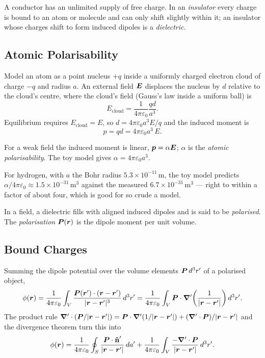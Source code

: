 A conductor has an unlimited supply of free charge. In an \emph{insulator} every charge is bound to an atom or molecule and can only shift slightly within it; an insulator whose charges shift to form induced dipoles is a \emph{dielectric}.

\subsection{Atomic Polarisability}

\begin{example}
Model an atom as a point nucleus $+q$ inside a uniformly charged electron cloud of charge $-q$ and radius $a$. An external field $\vect{E}$ displaces the nucleus by $d$ relative to the cloud's centre, where the cloud's field (Gauss's law inside a uniform ball) is
\[
    E_\text{cloud} = \frac{1}{4\pi\varepsilon_0}\frac{qd}{a^3}.
\]
Equilibrium requires $E_\text{cloud}=E$, so $d = 4\pi\varepsilon_0 a^3E/q$ and the induced moment is
\[
    p = qd = 4\pi\varepsilon_0a^3\,E .
\]
\end{example}

\begin{definition}
For a weak field the induced moment is linear, $\lvect{p}=\alpha\vect{E}$; $\alpha$ is the \emph{atomic polarisability}. The toy model gives $\alpha=4\pi\varepsilon_0a^3$.
\end{definition}

For hydrogen, with $a$ the Bohr radius $5.3\times10^{-11}$\,m, the toy model predicts $\alpha/4\pi\varepsilon_0\approx1.5\times10^{-31}\,\text{m}^3$ against the measured $6.7\times10^{-31}\,\text{m}^3$ --- right to within a factor of about four, which is good for so crude a model.

\begin{definition}[Polarisation]
In a field, a dielectric fills with aligned induced dipoles and is said to be \emph{polarised}. The \emph{polarisation} $\vect{P}(\lvect{r})$ is the dipole moment per unit volume.
\end{definition}

\subsection{Bound Charges}

Summing the dipole potential over the volume elements $\vect{P}\,d^3r'$ of a polarised object,
\[
    \phi(\lvect{r}) = \frac{1}{4\pi\varepsilon_0}\int_V\frac{\vect{P}(\lvect{r}')\cdot(\lvect{r}-\lvect{r}')}{|\lvect{r}-\lvect{r}'|^3}\,d^3r'
    = \frac{1}{4\pi\varepsilon_0}\int_V\vect{P}\cdot\grad'\!\left(\frac{1}{|\lvect{r}-\lvect{r}'|}\right)d^3r' .
\]
The product rule $\grad'\cdot(\vect{P}/|\lvect{r}-\lvect{r}'|) = \vect{P}\cdot\grad'(1/|\lvect{r}-\lvect{r}'|) + (\grad'\cdot\vect{P})/|\lvect{r}-\lvect{r}'|$ and the divergence theorem turn this into
\[
    \phi(\lvect{r}) = \frac{1}{4\pi\varepsilon_0}\oint_S\frac{\vect{P}\cdot\uvect{n}'}{|\lvect{r}-\lvect{r}'|}\,da'
    + \frac{1}{4\pi\varepsilon_0}\int_V\frac{-\grad'\cdot\vect{P}}{|\lvect{r}-\lvect{r}'|}\,d^3r' .
\]

